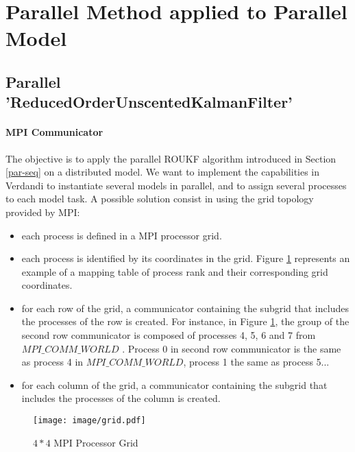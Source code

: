 \documentclass{tufte-book}
\begin{document}
\hypertarget{par-par}{}\section{Parallel Method applied to Parallel Model}\label{par-par}


\hypertarget{par-par-pr}{}\subsection{Parallel 'ReducedOrderUnscentedKalmanFilter'}\label{par-par-pr}


\hypertarget{par-par-pr-mc}{}\paragraph{MPI Communicator}\label{par-par-pr-mc}


The objective is to apply the parallel ROUKF algorithm introduced in Section \ref{par-seq} on  a distributed model. We want to implement the capabilities in Verdandi to instantiate several models in parallel, and to assign several processes to each model task. A possible solution consist in using the grid topology provided by MPI:


\begin{itemize}

\item each process is defined in a MPI processor grid.

\item each process is identified by its coordinates in the grid. Figure \ref{fig:mpi_grid} represents an example of a mapping table of process rank and their corresponding grid coordinates.

\item  for each row of the grid,  a communicator containing the subgrid that includes the processes of the row is created. For instance,  in Figure \ref{fig:mpi_grid}, the group of the second row communicator is composed of processes 4, 5, 6 and 7 from $MPI\_COMM\_WORLD$ . Process 0 in second row communicator is the same as process 4 in $MPI\_COMM\_WORLD$, process 1 the same as process 5...

\item for each column of the grid,  a communicator containing the subgrid that includes the processes of the column is created.

\end{itemize}

\begin{figure}
  \caption{$4*4$ MPI Processor Grid }
  \label{fig:mpi_grid}
  \texttt{[image: image/grid.pdf]}

\end{figure}
\end{document}
